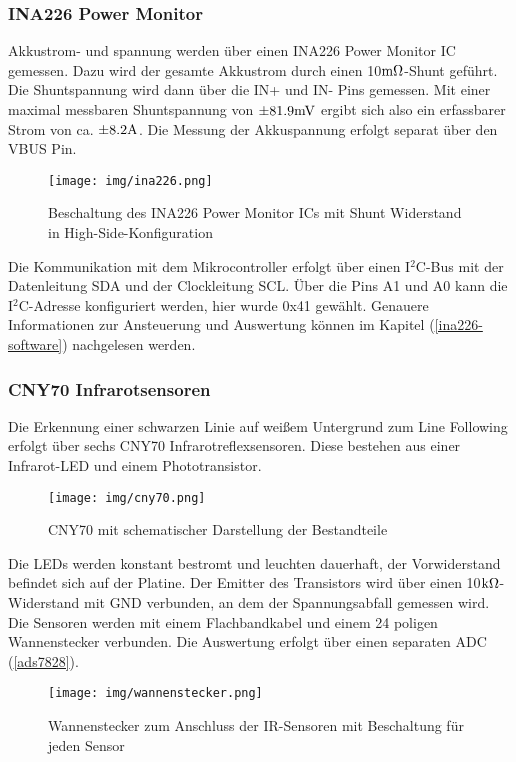 \documentclass[12pt, a4paper]{report}
\begin{document}
            \subsubsection{INA226 Power Monitor}
            Akkustrom- und spannung werden über einen INA226 Power Monitor IC gemessen. Dazu wird der gesamte Akkustrom durch einen 10$\si[]{\milli\ohm}$-Shunt geführt. Die Shuntspannung wird dann über die IN+ und IN- Pins gemessen. Mit einer maximal messbaren Shuntspannung von $\pm 81.9\si[]{\milli\volt}$ ergibt sich also ein erfassbarer Strom von ca. $\pm 8.2\si[]{\ampere}$.
            Die Messung der Akkuspannung erfolgt separat über den VBUS Pin.
            \begin{figure}[H]
               \centering
               \texttt{[image: img/ina226.png]}
               \caption{Beschaltung des INA226 Power Monitor ICs mit Shunt Widerstand in High-Side-Konfiguration}
            \end{figure}
            Die Kommunikation mit dem Mikrocontroller erfolgt über einen I$^2$C-Bus mit der Datenleitung SDA und der Clockleitung SCL. Über die Pins A1 und A0 kann die I$^2$C-Adresse konfiguriert werden, hier wurde 0x41 gewählt. Genauere Informationen zur Ansteuerung und Auswertung können im Kapitel (\ref{ina226-software}) nachgelesen werden.
            \subsubsection{CNY70 Infrarotsensoren}
            Die Erkennung einer schwarzen Linie auf weißem Untergrund zum Line Following erfolgt über sechs CNY70 Infrarotreflexsensoren. Diese bestehen aus einer Infrarot-LED und einem Phototransistor.
            \begin{figure}[H]
               \centering
               \texttt{[image: img/cny70.png]}
               \caption{CNY70 mit schematischer Darstellung der Bestandteile}
            \end{figure}
            Die LEDs werden konstant bestromt und leuchten dauerhaft, der Vorwiderstand befindet sich auf der Platine. Der Emitter des Transistors wird über einen 10$\si[]{\kilo\ohm}$-Widerstand mit GND verbunden, an dem der Spannungsabfall gemessen wird.
            Die Sensoren werden mit einem Flachbandkabel und einem 24 poligen Wannenstecker verbunden. Die Auswertung erfolgt über einen separaten ADC (\ref{ads7828}).
            \begin{figure}[H]
               \centering
               \texttt{[image: img/wannenstecker.png]}
               \caption{Wannenstecker zum Anschluss der IR-Sensoren mit Beschaltung für jeden Sensor}
            \end{figure}
\end{document}
